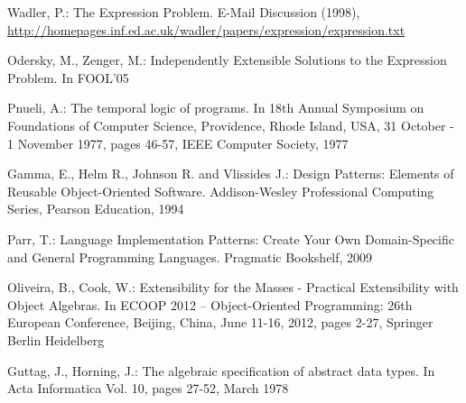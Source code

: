 \documentclass{llncs}
\begin{document}
%
%
\begin{thebibliography}{5}
%

Wadler, P.:
The Expression Problem.
E-Mail Discussion (1998),
\url{http://homepages.inf.ed.ac.uk/wadler/papers/expression/expression.txt}

Odersky, M., Zenger, M.:
Independently Extensible Solutions to the Expression Problem. 
In FOOL'05

Pnueli, A.:
The temporal logic of programs.
In 18th Annual Symposium on Foundations of Computer Science, Providence, Rhode Island, USA, 31 October - 1 November 1977, pages 46-57, IEEE Computer Society, 1977

Gamma, E., Helm R., Johnson R. and Vlissides J.:
Design Patterns: Elements of Reusable Object-Oriented Software.
Addison-Wesley Professional Computing Series, Pearson Education, 1994

Parr, T.:
Language Implementation Patterns: Create Your Own Domain-Specific and General Programming Languages.
Pragmatic Bookshelf, 2009

Oliveira, B., Cook, W.:
Extensibility for the Masses - Practical Extensibility with Object Algebras.
In ECOOP 2012 -- Object-Oriented Programming: 26th European Conference, Beijing, China, June 11-16, 2012, pages 2-27, Springer Berlin Heidelberg

Guttag, J., Horning, J.:
The algebraic specification of abstract data types.
In Acta Informatica Vol. 10, pages 27-52, March 1978

\end{thebibliography}
\end{document}

